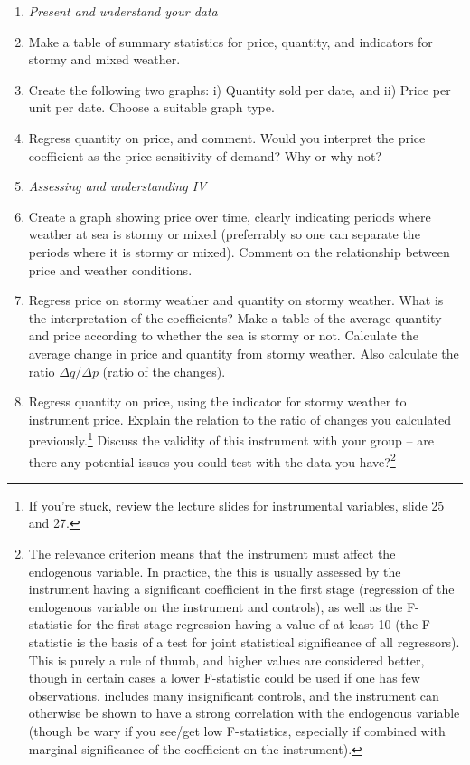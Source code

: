\documentclass[12pt,a4paper]{article}
\begin{document}
\begin{enumerate}
 \item[] \emph{Present and understand your data}
 \item Make a table of summary statistics for price, quantity, and indicators for stormy and mixed weather.
 \item Create the following two graphs: i) Quantity sold per date, and ii) Price per unit per date. Choose a suitable graph type.
 \item Regress quantity on price, and comment. Would you interpret the price coefficient as the price sensitivity of demand? Why or why not?
 \item[] \emph{Assessing and understanding IV}
 \item Create a graph showing price over time, clearly indicating periods where weather at sea is stormy or mixed (preferrably so one can separate the periods where it is stormy or mixed). Comment on the relationship between price and weather conditions.
 \item Regress price on stormy weather and quantity on stormy weather. What is the interpretation of the coefficients? Make a table of the average quantity and price according to whether the sea is stormy or not. Calculate the average change in price and quantity from stormy weather. Also calculate the ratio $\Delta q / \Delta p$ (ratio of the changes).
 \item Regress quantity on price, using the indicator for stormy weather to instrument price. Explain the relation to the ratio of changes you calculated previously.\footnote{If you're stuck, review the lecture slides for instrumental variables, slide 25 and 27.} Discuss the validity of this instrument with your group -- are there any potential issues you could test with the data you have?\footnote{The relevance criterion means that the instrument must affect the endogenous variable. In practice, the this is usually assessed by the instrument having a significant coefficient in the first stage (regression of the endogenous variable on the instrument and controls), as well as the F-statistic for the first stage regression having a value of at least 10 (the F-statistic is the basis of a test for joint statistical significance of all regressors). This is purely a rule of thumb, and higher values are considered better, though in certain cases a lower F-statistic could be used if one has few observations, includes many insignificant controls, and the instrument can otherwise be shown to have a strong correlation with the endogenous variable (though be wary if you see/get low F-statistics, especially if combined with marginal significance of the coefficient on the instrument).}

\end{enumerate}
\end{document}
